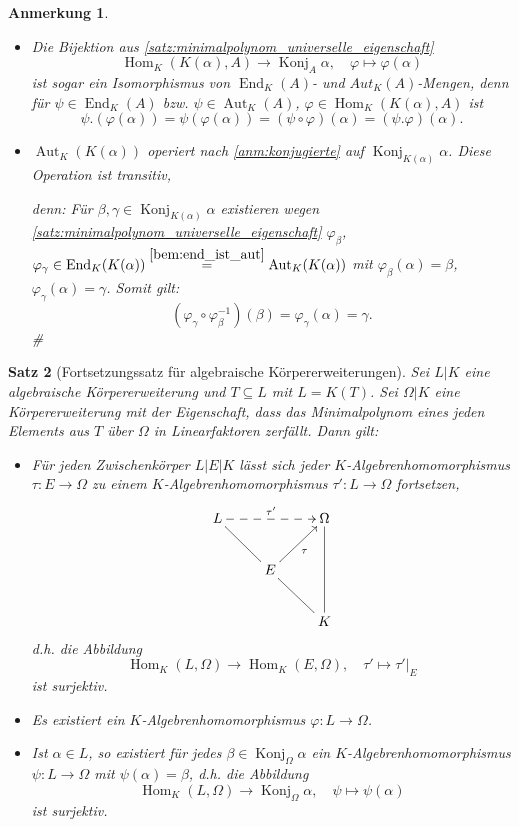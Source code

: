 \documentclass[a4paper, twoside, 11pt, ngerman]{report}
\DeclareMathOperator{\Aut}{Aut}
\DeclareMathOperator{\End}{End}
\DeclareMathOperator{\Hom}{Hom}
\DeclareMathOperator{\Konj}{Konj}
\theoremstyle{definistyle}
\newtheorem{satz}{Satz}[section]
\newtheorem{anm}[satz]{Anmerkung}
\theoremstyle{remark}
\newenvironment{denn}%
  {\par\textit{denn:}}%
  {\hfill\#\par}
\begin{document}
\begin{anm}\label{anm:automorphismen_operation}
\begin{itemize}
\item Die Bijektion aus \ref{satz:minimalpolynom_universelle_eigenschaft}
\[
\Hom_K(K(\alpha), A) \to \Konj_A\alpha, \quad \varphi \mapsto \varphi(\alpha)
\] ist sogar ein Isomorphismus von $\End_K(A)$- und $Aut_K(A)$-Mengen, denn
für $\psi\in\End_K(A)$ bzw. $\psi\in\Aut_K(A)$, $\varphi\in\Hom_K(K(\alpha),A)$ ist
\[
\psi.(\varphi(\alpha))=\psi(\varphi(\alpha))=(\psi\circ\varphi)(\alpha)=(\psi.\varphi)(\alpha).
\]

\item $\Aut_K(K(\alpha))$ operiert nach \ref{anm:konjugierte} auf $\Konj_{K(\alpha)}\alpha$. Diese Operation ist transitiv,
\begin{denn}
Für $\beta, \gamma\in \Konj_{K(\alpha)}\alpha$ existieren
wegen \ref{satz:minimalpolynom_universelle_eigenschaft} $\varphi_\beta$, $\varphi_\gamma \in \End_K(K(\alpha)) \overset{\ref{bem:end_ist_aut}}{=} \Aut_K(K(\alpha))$ mit $\varphi_\beta(\alpha) = \beta$, $\varphi_\gamma(\alpha) = \gamma$. Somit gilt:
\[
(\varphi_\gamma \circ \varphi_\beta^{-1})(\beta) = \varphi_\gamma(\alpha) = \gamma.
\]
\end{denn}
\end{itemize}
\end{anm}

\begin{satz}[Fortsetzungssatz für algebraische Körpererweiterungen]\label{satz:fortsetzungssatz_algebraische_koerpererweiterungen}
Sei $L|K$ eine algebraische Körpererweiterung und $T \subseteq L$ mit $L = K(T)$. Sei $\Omega|K$ eine Körpererweiterung mit der Eigenschaft, dass das Minimalpolynom eines jeden Elements aus $T$ über $\Omega$ in Linearfaktoren zerfällt. Dann gilt:
\begin{itemize}
    \item[(a)] Für jeden Zwischenkörper $L|E|K$ lässt sich jeder $K$-Algebrenhomomorphismus $\tau \colon E \to \Omega$ zu einem $K$-Algebrenhomomorphismus $\tau' \colon L \to \Omega$ fortsetzen,
    \[
\xymatrix{
L \ar@{-}[dr] \ar@{-->}[rr]^{\tau'} & & \Omega \ar@{-}[dd] \\
 & E \ar[ur]_\tau \ar@{-}[dr] &  \\
 & & K
}
\]
d.h. die Abbildung
\[
\Hom_K(L,\Omega)\to\Hom_K(E,\Omega), \quad \tau'\mapsto \tau'|_E
\]
ist surjektiv.
    \item[(b)] Es existiert ein $K$-Algebrenhomomorphismus $\varphi \colon L \to \Omega$.
    \item[(c)] Ist $\alpha \in L$, so existiert für jedes $\beta \in \Konj_\Omega\alpha$ ein $K$-Algebrenhomomorphismus $\psi \colon L \to \Omega$ mit $\psi(\alpha) = \beta$, d.h.
    die Abbildung
    \[
    \Hom_K(L,\Omega)\to \Konj_\Omega\alpha, \quad \psi\mapsto\psi(\alpha)
    \]
    ist surjektiv.
\end{itemize}
\end{satz}
\end{document}
